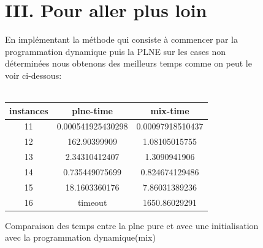 \documentclass[a4paper]{memoir}
\begin{document}
\begin{figure}[h]
\section{III. Pour aller plus loin}
En implémentant la méthode qui consiste à commencer par la programmation dynamique puis la PLNE sur les cases non déterminées nous obtenons des meilleurs temps comme on peut le voir ci-dessous:\\\\
\begin{center}
\begin{tabular}{|c||c||c|}
\hline
instances & plne-time & mix-time \\ 
\hline
11 & 0.000541925430298 & 0.00097918510437 \\ 
\hline
12 & 162.90399909 & 1.08105015755 \\ 
\hline
13 & 2.34310412407 & 1.3090941906 \\ 
\hline
14 & 0.735449075699 & 0.824674129486 \\ 
\hline
15 & 18.1603360176 & 7.86031389236 \\ 
\hline
16 & timeout & 1650.86029291 \\ 
\hline
\end{tabular}
\end{center}

\caption{Comparaison des temps entre la plne pure et avec une initialisation avec la programmation dynamique(mix)}
\end{figure}

    
     
\end{document}
